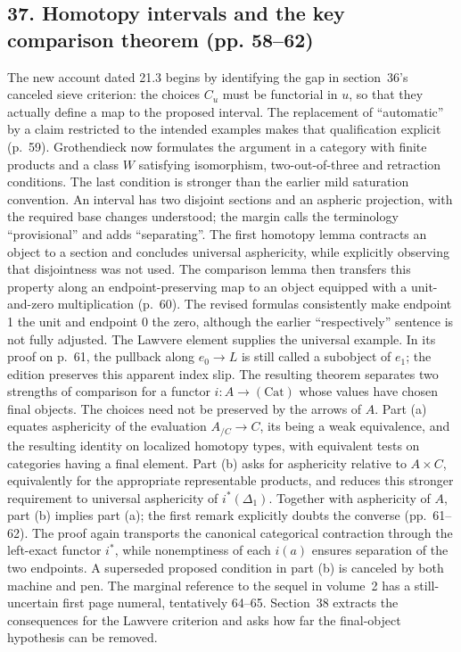 \documentclass[10pt,oneside]{book}
\begin{document}
\subsection*{37. Homotopy intervals and the key comparison theorem (pp. 58--62)}
The new account dated 21.3 begins by identifying the gap in section~36's canceled sieve criterion: the choices $C_u$ must be functorial in $u$, so that they actually define a map to the proposed interval. The replacement of ``automatic'' by a claim restricted to the intended examples makes that qualification explicit (p.~59). Grothendieck now formulates the argument in a category with finite products and a class $W$ satisfying isomorphism, two-out-of-three and retraction conditions. The last condition is stronger than the earlier mild saturation convention. An interval has two disjoint sections and an aspheric projection, with the required base changes understood; the margin calls the terminology ``provisional'' and adds ``separating''. The first homotopy lemma contracts an object to a section and concludes universal asphericity, while explicitly observing that disjointness was not used. The comparison lemma then transfers this property along an endpoint-preserving map to an object equipped with a unit-and-zero multiplication (p.~60). The revised formulas consistently make endpoint 1 the unit and endpoint 0 the zero, although the earlier ``respectively'' sentence is not fully adjusted. The Lawvere element supplies the universal example. In its proof on p.~61, the pullback along $e_0\to L$ is still called a subobject of $e_1$; the edition preserves this apparent index slip. The resulting theorem separates two strengths of comparison for a functor $i:A\to(\mathrm{Cat})$ whose values have chosen final objects. The choices need not be preserved by the arrows of $A$. Part (a) equates asphericity of the evaluation $A_{/C}\to C$, its being a weak equivalence, and the resulting identity on localized homotopy types, with equivalent tests on categories having a final element. Part (b) asks for asphericity relative to $A\times C$, equivalently for the appropriate representable products, and reduces this stronger requirement to universal asphericity of $i^*(\Delta_1)$. Together with asphericity of $A$, part (b) implies part (a); the first remark explicitly doubts the converse (pp.~61--62). The proof again transports the canonical categorical contraction through the left-exact functor $i^*$, while nonemptiness of each $i(a)$ ensures separation of the two endpoints. A superseded proposed condition in part (b) is canceled by both machine and pen. The marginal reference to the sequel in volume~2 has a still-uncertain first page numeral, tentatively 64--65. Section~38 extracts the consequences for the Lawvere criterion and asks how far the final-object hypothesis can be removed.
\end{document}
